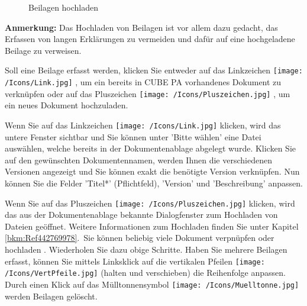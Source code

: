 \begin{figure}[H]
\caption{Beilagen hochladen}
\end{figure}

\textbf{Anmerkung:} Das Hochladen von Beilagen ist vor allem dazu gedacht, das Erfassen von langen Erklärungen zu vermeiden und dafür auf eine hochgeladene Beilage zu verweisen.

\vspace{\baselineskip}

Soll eine Beilage erfasst werden, klicken Sie entweder auf das Linkzeichen \texttt{[image: /Icons/Link.jpg]} , um ein bereits in CUBE PA vorhandenes Dokument zu verknüpfen oder auf das Pluszeichen \texttt{[image: /Icons/Pluszeichen.jpg]} , um ein neues Dokument hochzuladen. 

\vspace{\baselineskip}

Wenn Sie auf das Linkzeichen \texttt{[image: /Icons/Link.jpg]}  klicken, wird das untere Fenster sichtbar und Sie können unter 'Bitte wählen'  eine Datei auswählen, welche bereits in der Dokumentenablage abgelegt wurde. Klicken Sie auf den gewünschten Dokumentennamen, werden Ihnen die verschiedenen Versionen angezeigt und Sie können exakt die benötigte Version verknüpfen. Nun können Sie die Felder 'Titel*' (Pflichtfeld), 'Version' und 'Beschreibung'  anpassen.

\vspace{\baselineskip}

Wenn Sie auf das Pluszeichen \texttt{[image: /Icons/Pluszeichen.jpg]}  klicken, wird das aus der Dokumentenablage bekannte Dialogfenster zum Hochladen von Dateien geöffnet. Weitere Informationen zum Hochladen finden Sie unter Kapitel \ref{bkm:Ref442769978}.\
Sie können beliebig viele Dokument verpnüpfen  oder hochladen . Wiederholen Sie dazu obige Schritte. Haben Sie mehrere Beilagen erfasst, können Sie mittels Linksklick auf die vertikalen Pfeilen \texttt{[image: /Icons/VertPfeile.jpg]}  (halten und verschieben) die Reihenfolge anpassen. Durch einen Klick auf das Mülltonnensymbol \texttt{[image: /Icons/Muelltonne.jpg]}  werden Beilagen gelöscht.

